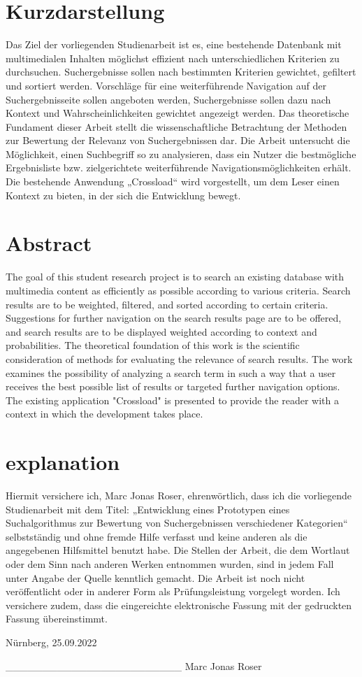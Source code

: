 \thispagestyle{empty}
\section*{Kurzdarstellung}
\label{sec:kurzdarstellung}
Das Ziel der vorliegenden Studienarbeit ist es, eine bestehende Datenbank mit multimedialen Inhalten möglichst effizient nach unterschiedlichen Kriterien zu durchsuchen.
Suchergebnisse sollen nach bestimmten Kriterien gewichtet, gefiltert und sortiert werden. Vorschläge für eine weiterführende Navigation auf der Suchergebnisseite sollen angeboten werden, Suchergebnisse sollen dazu nach Kontext und Wahrscheinlichkeiten gewichtet angezeigt werden.
Das theoretische Fundament dieser Arbeit stellt die wissenschaftliche Betrachtung der Methoden zur Bewertung der Relevanz von Suchergebnissen dar. Die Arbeit untersucht die Möglichkeit, einen Suchbegriff so zu analysieren, dass ein Nutzer die bestmögliche Ergebnisliste bzw. zielgerichtete weiterführende Navigationsmöglichkeiten erhält.
Die bestehende Anwendung „Crossload“ wird vorgestellt, um dem Leser einen Kontext zu bieten, in der sich die Entwicklung bewegt.

\section*{Abstract}
\label{sec:abstract}
The goal of this student research project is to search an existing database with multimedia content as efficiently as possible according to various criteria.
Search results are to be weighted, filtered, and sorted according to certain criteria. Suggestions for further navigation on the search results page are to be offered, and search results are to be displayed weighted according to context and probabilities.
The theoretical foundation of this work is the scientific consideration of methods for evaluating the relevance of search results. The work examines the possibility of analyzing a search term in such a way that a user receives the best possible list of results or targeted further navigation options.
The existing application "Crossload" is presented to provide the reader with a context in which the development takes place.

\section*{explanation}
\label{sec:explanation}
Hiermit versichere ich, Marc Jonas Roser, ehrenwörtlich, dass ich die vorliegende Studienarbeit mit dem Titel: „Entwicklung eines Prototypen eines Suchalgorithmus zur Bewertung von Suchergebnissen verschiedener Kategorien“ selbstständig und ohne fremde Hilfe verfasst und keine anderen als die angegebenen Hilfsmittel benutzt habe. Die Stellen der Arbeit, die dem Wortlaut oder dem Sinn nach anderen Werken entnommen wurden, sind in jedem Fall unter Angabe der Quelle kenntlich gemacht. Die Arbeit ist noch nicht veröffentlicht oder in anderer Form als Prüfungsleistung vorgelegt worden.
Ich versichere zudem, dass die eingereichte elektronische Fassung mit der gedruckten Fassung übereinstimmt.

Nürnberg, 25.09.2022

________________________
Marc Jonas Roser
